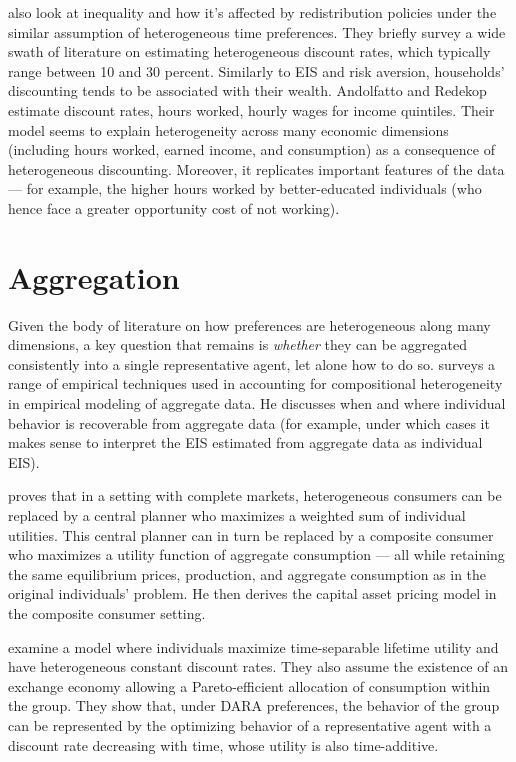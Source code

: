 \documentclass{hw}
\begin{document}
\cite{andolfatto98} also look at inequality and how it's affected by redistribution policies under the similar assumption of heterogeneous time preferences. They briefly survey a wide swath of literature on estimating heterogeneous discount rates, which typically range between 10 and 30 percent. Similarly to EIS and risk aversion, households' discounting tends to be associated with their wealth. Andolfatto and Redekop estimate discount rates, hours worked, hourly wages for income quintiles. Their model seems to explain heterogeneity across many economic dimensions (including hours worked, earned income, and consumption) as a consequence of heterogeneous discounting. Moreover, it replicates important features of the data --- for example, the higher hours worked by better-educated individuals (who hence face a greater opportunity cost of not working).

\section{Aggregation}
Given the body of literature on how preferences are heterogeneous along many dimensions, a key question that remains is \textit{whether} they can be aggregated consistently into a single representative agent, let alone how to do so. \cite{stoker93} surveys a range of empirical techniques used in accounting for compositional heterogeneity in empirical modeling of aggregate data. He discusses when and where individual behavior is recoverable from aggregate data (for example, under which cases it makes sense to interpret the EIS estimated from aggregate data as individual EIS).

\cite{constantinides82} proves that in a setting with complete markets, heterogeneous consumers can be replaced by a central planner who maximizes a weighted sum of individual utilities. This central planner can in turn be replaced by a composite consumer who maximizes a utility function of aggregate consumption --- all while retaining the same equilibrium prices, production, and aggregate consumption as in the original individuals' problem. He then derives the capital asset pricing model in the composite consumer setting.

\cite{gollier05} examine a model where individuals maximize time-separable lifetime utility and have heterogeneous constant discount rates. They also assume the existence of an exchange economy allowing a Pareto-efficient allocation of consumption within the group. They show that, under DARA preferences, the behavior of the group can be represented by the optimizing behavior of a representative agent with a discount rate decreasing with time, whose utility is also time-additive.
\end{document}
